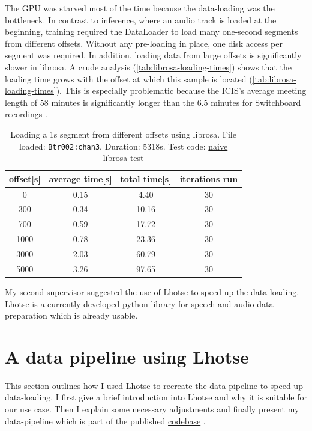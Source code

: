\documentclass[bsc,frontabs,parskip,deptreport]{infthesis}
\newcommand{\coderepo}{\href{https://github.com/LasseWolter/laughter-detection-icsi}{codebase} }
\begin{document}
The GPU was starved most of the time because the data-loading was the bottleneck. In contrast to inference, where an audio track is loaded at the beginning, training required the DataLoader to load many one-second segments from different offsets.
Without any pre-loading in place, one disk access per segment was required. 
In addition, loading data from large offsets is significantly slower in librosa. A crude analysis (\autoref{tab:librosa-loading-times}) shows that the loading time grows with the offset at which this sample is located (\autoref{tab:librosa-loading-times}). 
This is especially problematic because the ICIS's average meeting length of 58 minutes \citep{icsi-ldc} is significantly longer than the 6.5 minutes for Switchboard recordings \citep{switchboard-ldc}.

\begin{table}[h!]
    \centering
    \begin{tabular}{|c|c|c|c|}
    \hline
    offset[s] & average time[s] & total time[s] & iterations run \\
    \hline
    0  & 0.15 & 4.40 & 30    \\
    300 & 0.34 & 10.16 & 30  \\ 
    700 & 0.59 & 17.72 & 30  \\
    1000 & 0.78 & 23.36 & 30 \\  
    3000 & 2.03 & 60.79 & 30 \\
    5000 & 3.26 & 97.65 & 30 \\
    \hline
    \end{tabular}
    \caption{Loading a 1s segment from different offsets using librosa. File loaded: \texttt{Btr002:chan3}. Duration: 5318s. Test code: \href{https://github.com/LasseWolter/laughter-detection-icsi/tree/main/misc_scripts}{naive librosa-test}}
    \label{tab:librosa-loading-times}
\end{table}


My second supervisor suggested the use of Lhotse \citep{zelasko2021lhotse} to speed up the data-loading. Lhotse is a currently developed python library for speech and audio data preparation which is already usable.

\section{A data pipeline using Lhotse}
This section outlines how I used Lhotse to recreate the data pipeline to speed up data-loading. I first give a brief introduction into Lhotse and why it is suitable for our use case. Then I explain some necessary adjustments and finally present my data-pipeline which is part of the published \coderepo.
\end{document}

